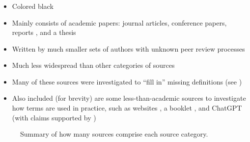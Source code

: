\subsubsection{}
\label{papers}
\begin{itemize}
    \item Colored black
    \item Mainly consists of academic papers: journal articles, conference
          papers, reports \citep{Kam2008,Gerrard2000a,Gerrard2000b}, and a
          thesis \citep{Bas2024}
    \item Written by much smaller sets of authors with unknown peer review
          processes
    \item Much less widespread than other categories of sources
    \item Many of these sources were investigated to ``fill in''
          missing definitions (see )
    \item Also included (for brevity) are some less-than-academic sources to
          investigate how terms are used in practice, such as websites
          \citep{LambdaTest2024,Pandey2023}, a booklet \citep{SPICE2022},
          and \ifnotpaper \else ChatGPT \fi \citet{ChatGPT2024} (with claims
          supported by \citet{RusEtAl2008})
\end{itemize}

\ifnotpaper
    \begin{figure}[hbtp!]
        \centering
        \caption{Summary of how many sources comprise each source category.}
        \label{fig:sourceSummary}
    \end{figure}

